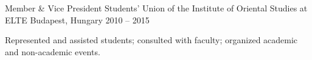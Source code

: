 
\begin{cventries}
    
  \cventry
    {Member \& Vice President} %
    {Students’ Union of the Institute of Oriental Studies at ELTE} %
    {Budapest, Hungary} %
    {2010 -- 2015} %
    {
      \begin{cvitems} %
        \item {Represented and assisted students; consulted with faculty; organized academic and non-academic events.}
      \end{cvitems}
    }


\end{cventries}
